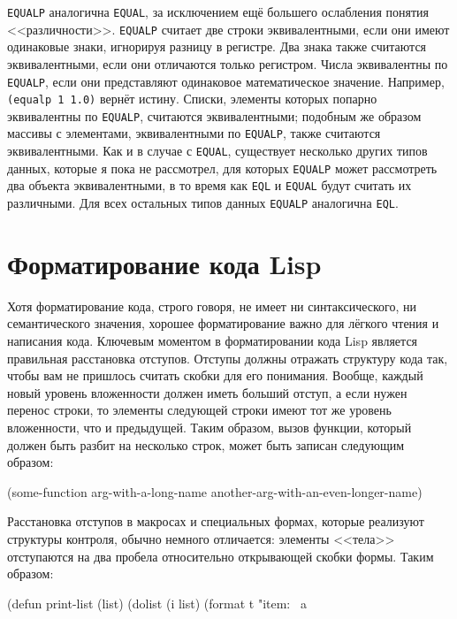 \lstinline{EQUALP} аналогична \lstinline{EQUAL}, за исключением ещё большего ослабления понятия
<<различности>>. \lstinline{EQUALP} считает две строки эквивалентными, если они имеют
одинаковые знаки, игнорируя разницу в регистре. Два знака также считаются эквивалентными,
если они отличаются только регистром. Числа эквивалентны по \lstinline{EQUALP}, если они
представляют одинаковое математическое значение. Например, \lstinline{(equalp 1 1.0)} вернёт
истину. Списки, элементы которых попарно эквивалентны по \lstinline{EQUALP}, считаются
эквивалентными; подобным же образом массивы с элементами, эквивалентными по
\lstinline{EQUALP}, также считаются эквивалентными. Как и в случае с \lstinline{EQUAL},
существует несколько других типов данных, которые я пока не рассмотрел, для которых
\lstinline{EQUALP} может рассмотреть два объекта эквивалентными, в то время как \lstinline{EQL}
и \lstinline{EQUAL} будут считать их различными. Для всех остальных типов данных
\lstinline{EQUALP} аналогична \lstinline{EQL}.

\section{Форматирование кода Lisp}

Хотя форматирование кода, строго говоря, не имеет ни синтаксического, ни семантического
значения, хорошее форматирование важно для лёгкого чтения и написания кода. Ключевым
моментом в форматировании кода Lisp является правильная расстановка отступов. Отступы
должны отражать структуру кода так, чтобы вам не пришлось считать скобки для его
понимания. Вообще, каждый новый уровень вложенности должен иметь больший отступ, а если
нужен перенос строки, то элементы следующей строки имеют тот же уровень вложенности, что и
предыдущей. Таким образом, вызов функции, который должен быть разбит на несколько строк,
может быть записан следующим образом:

\begin{myverb}
  (some-function arg-with-a-long-name
                 another-arg-with-an-even-longer-name)
\end{myverb}

Расстановка отступов в макросах и специальных формах, которые реализуют структуры
контроля, обычно немного отличается: элементы <<тела>> отступаются на два пробела
относительно открывающей скобки формы. Таким образом:

\begin{myverb}
  (defun print-list (list)
    (dolist (i list)
      (format t "item: ~a~%
\end{myverb}

